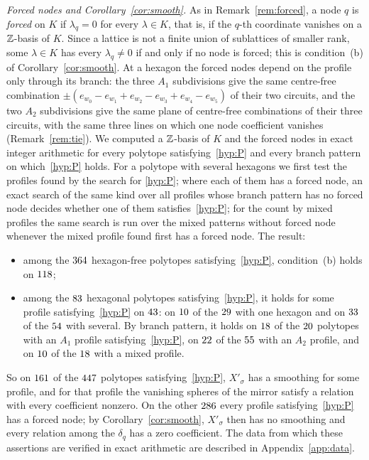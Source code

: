 \emph{Forced nodes and Corollary~\ref{cor:smooth}.} As in Remark~\ref{rem:forced}, a node $q$ is \emph{forced} on $K$ if $\lambda_q=0$ for every
$\lambda\in K$, that is, if the $q$-th coordinate vanishes on a $\mathbb Z$-basis of $K$. Since a lattice is not a finite union
of sublattices of smaller rank, some $\lambda\in K$ has every $\lambda_q\neq0$ if and only if no node is forced; this is
condition~(b) of Corollary~\ref{cor:smooth}. At a hexagon the forced nodes depend on the profile only through its branch:
the three $A_1$ subdivisions give the same centre-free combination $\pm(e_{w_0}-e_{w_1}+e_{w_2}-e_{w_3}+e_{w_4}-e_{w_5})$ of
their two circuits, and the two $A_2$ subdivisions give the same plane of centre-free combinations of their three circuits,
with the same three lines on which one node coefficient vanishes (Remark~\ref{rem:tie}). We computed a
$\mathbb Z$-basis of $K$ and the forced nodes in exact integer arithmetic for every polytope satisfying~\ref{hyp:P} and every branch pattern
on which~\ref{hyp:P} holds. For a polytope with several hexagons we first test the profiles found by the search for
\ref{hyp:P}; where each of them has a forced node, an exact search of the same kind over all profiles whose branch
pattern has no forced node decides whether one of them satisfies~\ref{hyp:P}; for the count by mixed profiles the same
search is run over the mixed patterns without forced node whenever the mixed profile found first has a forced node. The
result:
\begin{itemize}
\item among the $364$ hexagon-free polytopes satisfying~\ref{hyp:P}, condition~(b) holds on $118$;
\item among the $83$ hexagonal polytopes satisfying~\ref{hyp:P}, it holds for some profile satisfying~\ref{hyp:P} on
$43$: on $10$ of the $29$ with one hexagon and on $33$ of the $54$ with several.
By branch pattern, it holds on $18$ of the $20$ polytopes with an $A_1$ profile satisfying~\ref{hyp:P},
on $22$ of the $55$ with an $A_2$ profile, and on $10$ of the $18$ with a mixed
profile.
\end{itemize}
So on $161$ of the $447$ polytopes satisfying~\ref{hyp:P}, $X'_\sigma$ has a smoothing for some profile, and for that
profile the vanishing spheres of the mirror satisfy a relation with every coefficient nonzero. On the other
$286$ every profile satisfying~\ref{hyp:P} has a forced node; by Corollary~\ref{cor:smooth}, $X'_\sigma$ then has no
smoothing and every relation among the $\delta_q$ has a zero coefficient. The data from which these assertions are
verified in exact arithmetic are described in Appendix~\ref{app:data}.

